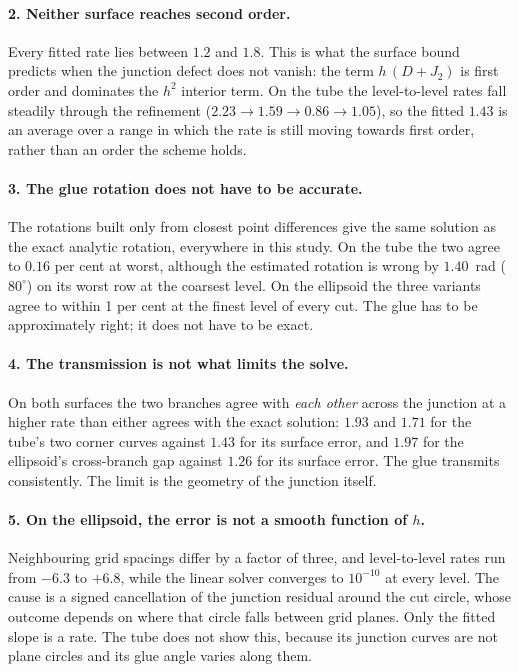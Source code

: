 \paragraph{2. Neither surface reaches second order.} Every fitted rate
lies between $1.2$ and $1.8$. This is what the surface bound predicts
when the junction defect does not vanish: the term $h\,(D+J_2)$ is first
order and dominates the $h^2$ interior term. On the tube the
level-to-level rates fall steadily through the refinement
($2.23 \to 1.59 \to 0.86 \to 1.05$), so the fitted $1.43$ is an average
over a range in which the rate is still moving towards first order,
rather than an order the scheme holds.

\paragraph{3. The glue rotation does not have to be accurate.} The
rotations built only from closest point differences give the same
solution as the exact analytic rotation, everywhere in this study. On the
tube the two agree to $0.16$ per cent at worst, although the estimated
rotation is wrong by $1.40$~rad ($80^\circ$) on its worst row at the
coarsest level. On the ellipsoid the three variants agree to within 1 per
cent at the finest level of every cut. The glue has to be approximately
right; it does not have to be exact.

\paragraph{4. The transmission is not what limits the solve.} On both
surfaces the two branches agree with \emph{each other} across the
junction at a higher rate than either agrees with the exact solution:
$1.93$ and $1.71$ for the tube's two corner curves against $1.43$ for its
surface error, and $1.97$ for the ellipsoid's cross-branch gap against
$1.26$ for its surface error. The glue transmits consistently. The limit
is the geometry of the junction itself.

\paragraph{5. On the ellipsoid, the error is not a smooth function of
$h$.} Neighbouring grid spacings differ by a factor of three, and
level-to-level rates run from $-6.3$ to $+6.8$, while the linear solver
converges to $10^{-10}$ at every level. The cause is a signed
cancellation of the junction residual around the cut circle, whose
outcome depends on where that circle falls between grid planes. Only the
fitted slope is a rate. The tube does not show this, because its junction
curves are not plane circles and its glue angle varies along them.

